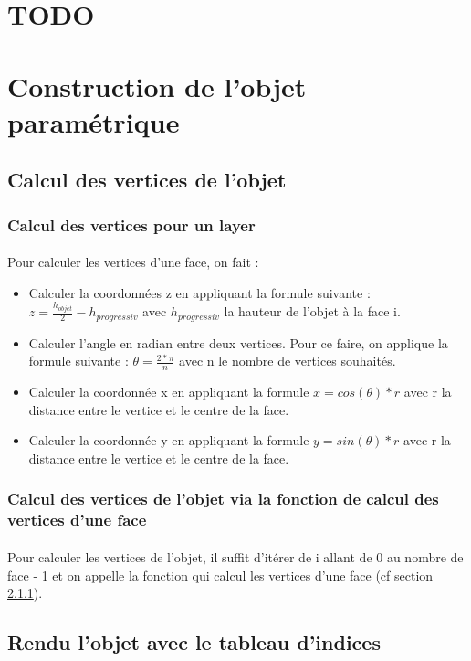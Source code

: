 \documentclass[article, backcover, french, nodocumentinfo]{upmethodology-document}
\newcommand{\TODO}[2][ ]{\todo[inline,color=green]{#2}}
\begin{document}
	\section{TODO}
		\TODO{TODO}
	\section{Construction de l'objet paramétrique}
	\subsection{Calcul des vertices de l'objet}
	\subsubsection{Calcul des vertices pour un layer}\label{a}
		\paragraph{} Pour calculer les vertices d'une face, on fait : 
		\begin{itemize}
			\item Calculer la coordonnées z en appliquant la formule suivante : $z = \frac{h_{objet}}{2} - h_{progressiv}$ avec $h_{progressiv}$ la hauteur de l'objet à la face i.
			\item Calculer l'angle en radian entre deux vertices. Pour ce faire, on applique la formule suivante : $\theta = \frac{2*\pi}{n}$ avec n le nombre de vertices souhaités.
			\item Calculer la coordonnée x en appliquant la formule $x = cos(\theta)*r$ avec r la distance entre le vertice et le centre de la face.
			\item Calculer la coordonnée y en appliquant la formule $y = sin(\theta)*r$ avec r la distance entre le vertice et le centre de la face.
		\end{itemize}
	\subsubsection{Calcul des vertices de l'objet via la fonction de calcul des vertices d'une face}
	\paragraph{} Pour calculer les vertices de l'objet, il suffit d'itérer de i allant de 0 au nombre de face - 1 et on appelle la fonction qui calcul les vertices d'une face (cf section \ref{a}).
	\subsection{Rendu l'objet avec le tableau d'indices}
\end{document}
